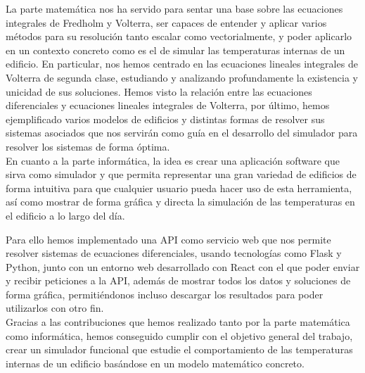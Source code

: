 La parte matemática nos ha servido para sentar una base sobre las ecuaciones integrales de Fredholm y Volterra, ser capaces de entender y aplicar varios métodos para su resolución tanto escalar como vectorialmente, y poder aplicarlo en un contexto concreto como es el de simular las temperaturas internas de un edificio. En particular, nos hemos centrado en las ecuaciones lineales integrales de Volterra de segunda clase, estudiando y analizando profundamente la existencia y unicidad de sus soluciones. Hemos visto la relación entre las ecuaciones diferenciales y ecuaciones lineales integrales de Volterra, por último, hemos ejemplificado varios modelos de edificios y distintas formas de resolver sus sistemas asociados que nos servirán como guía en el desarrollo del simulador para resolver los sistemas de forma óptima.\\

En cuanto a la parte informática, la idea es crear una aplicación software que sirva como simulador y que permita representar una gran variedad de edificios de forma intuitiva para que cualquier usuario pueda hacer uso de esta herramienta, así como mostrar de forma gráfica y directa la simulación de las temperaturas en el edificio a lo largo del día.

Para ello hemos implementado una API como servicio web que nos permite resolver sistemas de ecuaciones diferenciales, usando tecnologías como Flask y Python, junto con un entorno web desarrollado con React con el que poder enviar y recibir peticiones a la API, además de mostrar todos los datos y soluciones de forma gráfica, permitiéndonos incluso descargar los resultados para poder utilizarlos con otro fin.\\

Gracias a las contribuciones que hemos realizado tanto por la parte matemática como informática, hemos conseguido cumplir con el objetivo general del trabajo, crear un simulador funcional que estudie el comportamiento de las temperaturas internas de un edificio basándose en un modelo matemático concreto.
